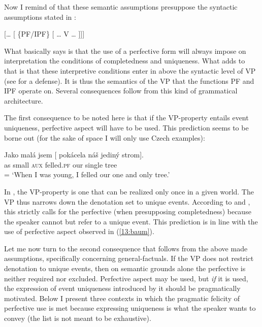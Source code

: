 \documentclass[output=paper,modfonts,newtxmath,hidelinks]{langscibook}
\begin{document}
\noindent Now I remind of that these semantic assumptions presuppose the syntactic assumptions stated in :

\begin{exe}
\ex\label{13:synas}
{} [{\dots} [ \{PF/IPF\} [ {\dots} V {\dots} ]]]
\end{exe}

\noindent What  basically says is that the use of a perfective form will always impose on interpretation the conditions of completedness
and uniqueness. What  adds to that is that these interpretive conditions enter in above the syntactic level of VP (see \citealt{Tate11,Tate13} for a defense). It is thus the semantics of the VP that the functions PF and IPF operate on. Several consequences follow from this kind of grammatical architecture.

The first consequence to be noted here is that if the VP-property entails event uniqueness, perfective aspect will have to be used.
This prediction seems to be borne out (for the sake of space I will only use Czech examples):

\begin{exe}
\ex\label{13:baum}
\gll Jako mal\'a jsem [ pok\'acela n\'a\v{s} jedin\'y strom].\\
as small \textsc{aux} {} felled.\textsc{pf} our single tree \\\hfill = 
\glt `When I was young, I felled our one and only tree.'
\end{exe}

\noindent In , the VP-property is one that can be realized only once in a given world. The VP thus narrows down the denotation set to unique events. According to  and , this strictly calls for the perfective (when presupposing completedness) because the speaker cannot but refer to a unique event. This prediction is in line with the use of perfective aspect observed in (\ref{13:baum}).


Let me now turn to the second consequence that follows from the above made assumptions, specifically concerning general-factuals. If the VP does not restrict denotation to unique events, then on semantic grounds alone the perfective is neither required nor excluded. Perfective aspect may be used, but \textit{if} it is used, the expression of event uniqueness introduced by it should be pragmatically motivated. Below I present three contexts in which the pragmatic felicity of perfective use is met because expressing uniqueness is what the speaker wants to convey (the list is not meant to be exhaustive).
\end{document}
